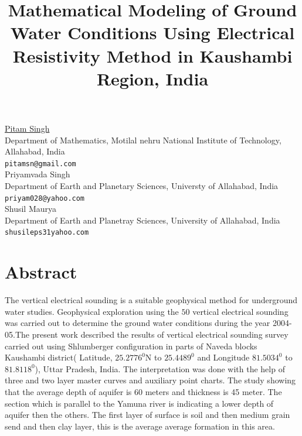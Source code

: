 \documentclass[article, A4, 11pt]{llncs}%
\begin{document}
\title{Mathematical Modeling of Ground Water Conditions Using Electrical Resistivity Method in Kaushambi Region, India}
 \author{} \institute{}
\maketitle
\begin{center}
{\large \underline{Pitam Singh}}\\
Department of Mathematics, Motilal nehru National Institute of Technology, Allahabad, India\\
{\tt pitamsn@gmail.com}
\\ \vspace{4mm}
{\large Priyamvada Singh}\\
Department of  Earth and Planetary Sciences, Universty of Allahabad,  India\\
{\tt priyam028@yahoo.com}
\\ \vspace{4mm}
{\large Shusil Maurya}\\
Department of Earth and Planetray Sciences, University of Allahabad, India\\
{\tt shusileps31yahoo.com}
\end{center}

\section*{Abstract}
The vertical electrical sounding is a suitable geophysical method for underground water studies. Geophysical exploration using the $50$ vertical electrical sounding was carried out to determine the ground water conditions during the year 2004-05.The present work described the results of vertical electrical sounding survey carried out using Shlumberger configuration in parts of Naveda blocks Kaushambi district( Latitude, $25.2776^{0}$N to $25.4489^0$ and Longitude $81.5034^0$ to $81.8118^0$), Uttar Pradesh, India. The interpretation was done with the help of three and two layer master curves and auxiliary point charts. The study showing that the average depth of aquifer is $60$ meters and thickness is 45 meter. The section which is parallel to the Yamuna river is indicating a lower depth of aquifer then the others. The first layer of surface is soil and then medium grain send and then clay layer, this is the average average formation in this area.
\end{document}
